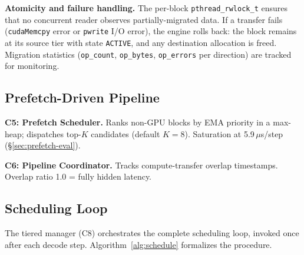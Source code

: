 \documentclass[conference]{IEEEtran}
\begin{document}
\textbf{Atomicity and failure handling.} The per-block \texttt{pthread\_rwlock\_t} ensures that no concurrent reader observes partially-migrated data. If a transfer fails (\texttt{cudaMemcpy} error or \texttt{pwrite} I/O error), the engine rolls back: the block remains at its source tier with state \texttt{ACTIVE}, and any destination allocation is freed. Migration statistics (\texttt{op\_count}, \texttt{op\_bytes}, \texttt{op\_errors} per direction) are tracked for monitoring.

\subsection{Prefetch-Driven Pipeline}
\label{sec:pipeline}


\textbf{C5: Prefetch Scheduler.} Ranks non-GPU blocks by EMA priority in a max-heap; dispatches top-$K$ candidates (default $K{=}8$). Saturation at 5.9\,$\mu$s/step (\S\ref{sec:prefetch-eval}).

\textbf{C6: Pipeline Coordinator.} Tracks compute-transfer overlap timestamps. Overlap ratio 1.0 = fully hidden latency.

\subsection{Scheduling Loop}

The tiered manager (C8) orchestrates the complete scheduling loop, invoked once after each decode step. Algorithm~\ref{alg:schedule} formalizes the procedure.
\end{document}
